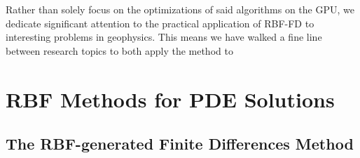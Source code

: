 \documentclass{report}
\begin{document}
{Rather than solely focus on the optimizations of said algorithms on the GPU, we dedicate significant attention to the practical application of RBF-FD to interesting problems in geophysics. This means we have walked a fine line between research topics to both apply the method to 


\chapter{RBF Methods for PDE Solutions} 

%
%
%




\section{The RBF-generated Finite Differences Method}


}
\end{document}

